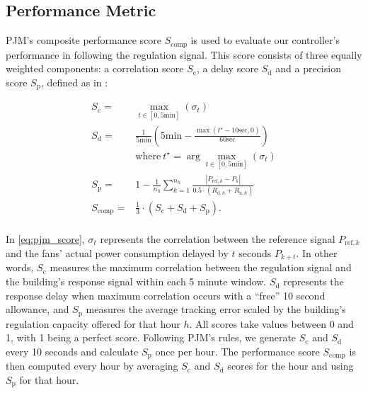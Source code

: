 

\subsection{Performance Metric}\label{sec:performance_metric}

PJM's composite performance score $S_\text{comp}$ is used to evaluate our controller's performance in following the regulation signal. 
This score consists of three equally weighted components: a correlation score $S_\text{c}$, a delay score $S_\text{d}$ and a precision score $S_\text{p}$, defined as in \cite{PJM12}:

\begin{equation}\label{eq:pjm_score}
\begin{aligned}
S_\text{c} = & \max_{t \in [0, 5 \text{min}]} (\sigma_t) \\
S_\text{d} = & \frac{1}{5 \text{min}} \left(5 \text{min} - \frac{\max(t^\star - 10 \text{sec},0)}{60\text{sec}}\right) \\
& \text{where}~t^\star =  \arg\max_{t \in [0, 5 \text{min}]} (\sigma_t)\\
S_\text{p} = & 1 - \frac{1}{n_h} \sum_{k=1}^{n_h}  \frac{\left | P_{\text{ref},k} - P_{k}\right |}{0.5\cdot(R_{\text{d},h} + R_{\text{u},h})}  \\
S_\text{comp} = & \frac{1}{3} \cdot \left( S_\text{c} + S_\text{d} + S_\text{p} \right).\\
\end{aligned}
\end{equation}

In \eqref{eq:pjm_score}, $\sigma_t$ represents the correlation between the reference signal $P_{\text{ref},k}$ and the fans' actual power consumption delayed by $t$ seconds $P_{k+t}$. In other words, $S_\text{c}$ measures the maximum correlation between the regulation signal and the building's response signal within each 5 minute window. $S_\text{d}$ represents the response delay when maximum correlation occurs with a ``free'' 10 second allowance, and $S_\text{p}$ measures the average tracking error scaled by the building's regulation capacity offered for that hour $h$.
All scores take values between 0 and 1, with 1 being a perfect score. 
Following PJM's rules, we generate $S_\text{c}$ and $S_\text{d}$ every 10 seconds and calculate $S_\text{p}$ once per hour.
The performance score $S_\text{comp}$ is then computed every hour by averaging $S_\text{c}$ and $S_\text{d}$ scores for the hour and using $S_\text{p}$ for that hour.



